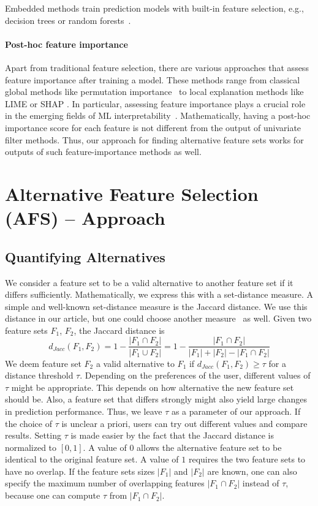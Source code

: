\documentclass{article}
\begin{document}
Embedded methods train prediction models with built-in feature selection, e.g., decision trees or random forests~\cite{breiman2001random}.

\paragraph{Post-hoc feature importance}

Apart from traditional feature selection, there are various approaches that assess feature importance after training a model.
These methods range from classical global methods like permutation importance~\cite{breiman2001random} to local explanation methods like LIME \cite{ribeiro2016should} or SHAP \cite{lundberg2017unified}.
In particular, assessing feature importance plays a crucial role in the emerging fields of ML interpretability~\cite{carvalho2019machine}.
Mathematically, having a post-hoc importance score for each feature is not different from the output of univariate filter methods.
Thus, our approach for finding alternative feature sets works for outputs of such feature-importance methods as well.

\section{Alternative Feature Selection (AFS) -- Approach}
\label{sec:approach}

\subsection{Quantifying Alternatives}

We consider a feature set to be a valid alternative to another feature set if it differs sufficiently.
Mathematically, we express this with a set-distance measure.
A simple and well-known set-distance measure is the Jaccard distance.
We use this distance in our article, but one could choose another measure~\cite{egghe2009new} as well.
Given two feature sets $F_1$, $F_2$, the Jaccard distance is
%
\[
	d_{Jacc}(F_1,F_2) = 1 - \frac{|F_1 \cap F_2|}{|F_1 \cup F_2|} = 1 - \frac{|F_1 \cap F_2|}{|F_1| + |F_2| - |F_1 \cap F_2|}
\]
%
We deem feature set $F_2$ a valid alternative to $F_1$ if $d_{Jacc}(F_1,F_2) \geq \tau$ for a distance threshold $\tau$.
Depending on the preferences of the user, different values of $\tau$ might be appropriate.
This depends on how alternative the new feature set should be.
Also, a feature set that differs strongly might also yield large changes in prediction performance.
Thus, we leave $\tau$ as a parameter of our approach.
If the choice of $\tau$ is unclear a priori, users can try out different values and compare results.
Setting $\tau$ is made easier by the fact that the Jaccard distance is normalized to $[0,1]$.
A value of $0$ allows the alternative feature set to be identical to the original feature set.
A value of $1$ requires the two feature sets to have no overlap.
If the feature sets sizes $|F_1|$ and $|F_2|$ are known, one can also specify the maximum number of overlapping features $|F_1 \cap F_2|$ instead of $\tau$, because one can compute $\tau$ from $|F_1 \cap F_2|$.
\end{document}
